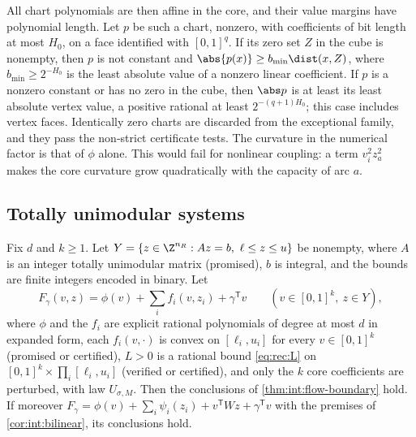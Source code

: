 All chart polynomials are then affine in the core, and their value margins
have polynomial length. Let $p$ be such a chart, nonzero, with coefficients
of bit length at most $H_0$, on a face identified with $[0,1]^q$. If its zero
set $Z$ in the cube is nonempty, then $p$ is not constant and
$\abs{p(x)}\ge b_{\min}\dist(x,Z)$, where $b_{\min}\ge2^{-H_0}$ is the least
absolute value of a nonzero linear coefficient. If $p$ is a nonzero constant
or has no zero in the cube, then $\abs p$ is at least its least absolute
vertex value, a positive rational at least $2^{-(q+1)H_0}$; this case includes
vertex faces. Identically zero charts are discarded from the exceptional
family, and they pass the non-strict certificate tests. The curvature in the
numerical factor is that of $\phi$ alone. This would fail for nonlinear
coupling: a term $v_i^2z_a^2$ makes the core curvature grow quadratically with
the capacity of arc $a$.

\subsection{Totally unimodular systems}\label{sec:int:tu}

\begin{theorem}\label{thm:int:tu}
Fix $d$ and $k\ge1$. Let $Y=\{z\in\Z^{n_R}:Az=b,\ \ell\le z\le u\}$ be
nonempty, where $A$ is an integer totally unimodular matrix (promised), $b$
is integral, and the bounds are finite integers encoded in binary. Let
\[
 F_\gamma(v,z)=\phi(v)+\sum_if_i(v,z_i)+\gamma^{\mathsf T}v
 \qquad(v\in[0,1]^k,\ z\in Y),
\]
where $\phi$ and the $f_i$ are explicit rational polynomials of degree at most
$d$ in expanded form, each $f_i(v,\cdot)$ is convex on $[\ell_i,u_i]$ for
every $v\in[0,1]^k$ (promised or certified), $L>0$ is a rational bound
\eqref{eq:rec:L} on $[0,1]^k\times\prod_i[\ell_i,u_i]$ (verified or
certified), and only the $k$ core coefficients are perturbed, with law
$U_{\sigma,M}$. Then the conclusions of \cref{thm:int:flow-boundary} hold. If
moreover $F_\gamma=\phi(v)+\sum_i\psi_i(z_i)+v^{\mathsf T}Wz+\gamma^{\mathsf T}v$
with the premises of \cref{cor:int:bilinear}, its conclusions hold.
\end{theorem}

